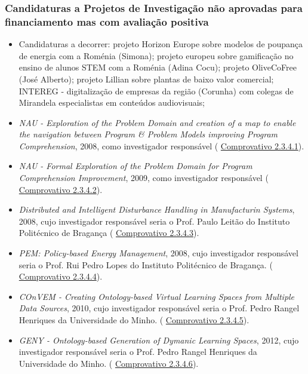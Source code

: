 \documentclass[11pt]{article}
\begin{document}
\subsubsection{Candidaturas a Projetos de Investigação não aprovadas para financiamento mas com avaliação positiva}
\begin{itemize}
\item{Candidaturas a decorrer: projeto Horizon Europe sobre modelos de poupança de energia com a Roménia (Simona); projeto europeu sobre gamificação no ensino de alunos STEM com a Roménia (Adina Cocu); projeto OliveCoFree (José Alberto); projeto Lillian sobre plantas de baixo valor comercial; INTEREG - digitalização de empresas da região (Corunha) com colegas de Mirandela especialistas em conteúdos audiovisuais;}
\item{{
\em{ NAU - Exploration of the Problem Domain and creation of a map to enable the navigation between Program 
\& Problem Models improving Program Comprehension}}, 2008, como investigador responsável (
\href{run:Projectos/CandidaturasNaoAprovadas/NAU.pdf}{Comprovativo 2.3.4.1}).}
\item{{
\em{ NAU - Formal Exploration of the Problem Domain for Program Comprehension Improvement}}, 2009, como investigador responsável (
\href{run:Projectos/CandidaturasNaoAprovadas/NAU2.pdf}{Comprovativo 2.3.4.2}).}
\item{{
\em{ Distributed and Intelligent Disturbance Handling in Manufacturin Systems}}, 2008, cujo investigador responsável seria o Prof. Paulo Leitão do Instituto Politécnico de Bragança (
\href{run:Projectos/CandidaturasNaoAprovadas/PauloLeitao.pdf}{Comprovativo 2.3.4.3}).}
\item{{
\em{ PEM: Policy-based Energy Management}}, 2008, cujo investigador responsável seria o Prof. Rui Pedro Lopes do Instituto Politécnico de Bragança. (
\href{run:Projectos/CandidaturasNaoAprovadas/RuiPedro.pdf}{Comprovativo 2.3.4.4}).}
\item{{
\em{ COnVEM - Creating Ontology-based Virtual Learning Spaces from Multiple Data Sources}}, 2010, cujo investigador responsável seria o Prof. Pedro Rangel Henriques da Universidade do Minho. (
\href{run:Projectos/CandidaturasNaoAprovadas/convem2010.pdf}{Comprovativo 2.3.4.5}).}
\item{{
\em{ GENY - Ontology-based Generation of Dymanic Learning Spaces}}, 2012, cujo investigador responsável seria o Prof. Pedro Rangel Henriques da Universidade do Minho. (
\href{run:Projectos/CandidaturasNaoAprovadas/GENY2012.pdf}{Comprovativo 2.3.4.6}).}

\end{itemize}
\end{document}
